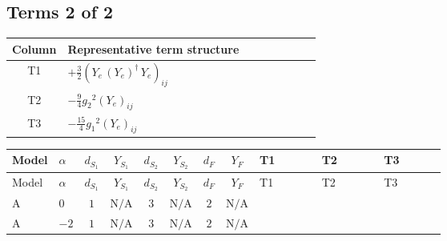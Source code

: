 \documentclass[8pt]{article}
\begin{document}
\begin{landscape}
\subsection*{Terms 2 of 2}
\begin{center}
\begin{tabular}{@{}c >{\raggedright\arraybackslash}p{0.82\linewidth}@{}}
\toprule
Column & Representative term structure \\
\midrule
T1 & \(\displaystyle +\frac{3}{2} \left({Y_e}\,\left({Y_e}\right)^{\dagger}\,{Y_e}\right)_{ij}\) \\
\midrule
T2 & \(\displaystyle -\frac{9}{4} {g_2}^2 \left({Y_e}\right)_{ij}\) \\
\midrule
T3 & \(\displaystyle -\frac{15}{4} {g_1}^2 \left({Y_e}\right)_{ij}\) \\
\midrule
\bottomrule
\end{tabular}
\end{center}
\smallskip
\tiny
\begin{longtable}{@{}llcccccc >{\raggedright\arraybackslash}p{0.21\linewidth} >{\raggedright\arraybackslash}p{0.21\linewidth} >{\raggedright\arraybackslash}p{0.21\linewidth}@{}}
\toprule
Model & $\alpha$ & $d_{S_1}$ & $Y_{S_1}$ & $d_{S_2}$ & $Y_{S_2}$ & $d_F$ & $Y_F$ & T1 & T2 & T3 \\
\midrule
\endfirsthead
\toprule
Model & $\alpha$ & $d_{S_1}$ & $Y_{S_1}$ & $d_{S_2}$ & $Y_{S_2}$ & $d_F$ & $Y_F$ & T1 & T2 & T3 \\
\midrule
\endhead
A & $0$ & $1$ & $\text{N/A}$ & $3$ & $\text{N/A}$ & $2$ & $\text{N/A}$ & \scriptsize\adjustbox{max width=\linewidth}{$\begin{gathered} +\frac{3}{2} \left({Y_e}\,\left({Y_e}\right)^{\dagger}\,{Y_e}\right)_{ij}\end{gathered}$} & \scriptsize\adjustbox{max width=\linewidth}{$\begin{gathered} -\frac{9}{4} {g_2}^2 \left({Y_e}\right)_{ij}\end{gathered}$} & \scriptsize\adjustbox{max width=\linewidth}{$\begin{gathered} -\frac{15}{4} {g_1}^2 \left({Y_e}\right)_{ij}\end{gathered}$} \\
\midrule
A & $-2$ & $1$ & $\text{N/A}$ & $3$ & $\text{N/A}$ & $2$ & $\text{N/A}$ & \scriptsize\adjustbox{max width=\linewidth}{$\begin{gathered} +\frac{3}{2} \left({Y_e}\,\left({Y_e}\right)^{\dagger}\,{Y_e}\right)_{ij}\end{gathered}$} & \scriptsize\adjustbox{max width=\linewidth}{$\begin{gathered} -\frac{9}{4} {g_2}^2 \left({Y_e}\right)_{ij}\end{gathered}$} & \scriptsize\adjustbox{max width=\linewidth}{$\begin{gathered} -\frac{15}{4} {g_1}^2 \left({Y_e}\right)_{ij}\end{gathered}$} \\

\end{longtable}
\end{landscape}
\end{document}

